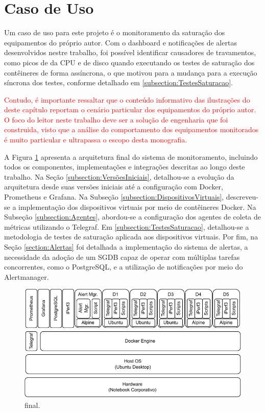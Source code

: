 \section{Caso de Uso}
\label{section:CasosDeUso}

Um caso de uso para este projeto é o monitoramento da saturação dos equipamentos do próprio autor. Com o dashboard e notificações de alertas desenvolvidos nestre trabalho, foi possível identificar causadores de travamentos, como picos de  da CPU e  de disco quando executando os testes de saturação dos contêineres de forma assíncrona, o que motivou para a mudança para a execução síncrona dos testes, conforme detalhado em \ref{subsection:TestesSaturacao}.

\textcolor{red}{Contudo, é importante ressaltar que o conteúdo informativo das ilustrações do deste capítulo reportam o cenário particular dos equipamentos do próprio autor. O foco do leitor neste trabalho deve ser a solução de engenharia que foi construida, visto que a análise do comportamento dos equipamentos monitorados é muito particular e ultrapassa o escopo desta monografia.}

A Figura \ref{fig:StackFinal} apresenta a arquitetura final do sistema de monitoramento, incluindo todos os componentes, implementações e integrações descritas ao longo deste trabalho. Na Seção \ref{subsection:VersõesIniciais}, detalhou-se a evolução da arquitetura desde suas versões iniciais até a configuração com Docker, Prometheus e Grafana. Na Subseção \ref{subsection:DispositivosVirtuais}, descreveu-se a implementação dos dispositivos virtuais por meio de contêineres Docker. Na Subseção \ref{subsection:Agentes}, abordou-se a configuração dos agentes de coleta de métricas utilizando o Telegraf. Em \ref{subsection:TestesSaturacao}, detalhou-se a metodologia de testes de saturação aplicada aos dispositivos virtuais. Por fim, na Seção \ref{section:Alertas} foi detalhada a implementação do sistema de alertas, a necessidade da adoção de um SGDB capaz de operar com múltiplas tarefas concorrentes, como o PostgreSQL, e a utilização de notificações por meio do Alertmanager.

\begin{figure}[H]
\centering
\setlength{\abovecaptionskip}{-20pt}
\includegraphics[width=\textwidth]{Imagens/chap04/final_stack.pdf}
\caption{ final.}
\label{fig:StackFinal}
\end{figure}


